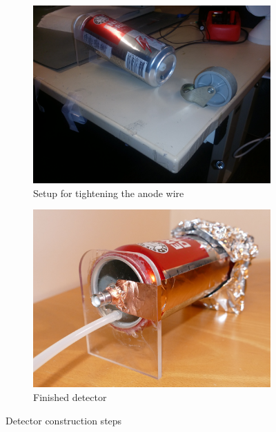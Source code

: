 \documentclass[a4paper]{article}
\begin{document}
\begin{figure}[ht!]
\begin{subfigure}[t]{0.48\textwidth}
\centering
\includegraphics[width=\textwidth]{fig/IMG_20201123_104201.jpg}
\caption{Setup for tightening the anode wire}
\label{fig:tightening}
\end{subfigure}
%
\begin{subfigure}[t]{0.48\textwidth}
\centering
\includegraphics[width=\textwidth]{fig/P1170847-cropped.jpg}
\caption{Finished detector}
\label{fig:detector}
\end{subfigure}
%
\caption{Detector construction steps}
\end{figure}
\end{document}
